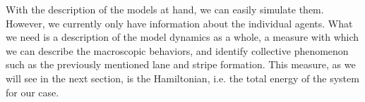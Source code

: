 With the description of the models at hand, we can easily simulate them. However, we currently only have information about the individual agents. What we need is a description of the model dynamics as a whole, a measure with which we can describe the macroscopic behaviors, and identify collective phenomenon such as the previously mentioned lane and stripe formation. This measure, as we will see in the next section, is the Hamiltonian, i.e. the total energy of the system for our case.